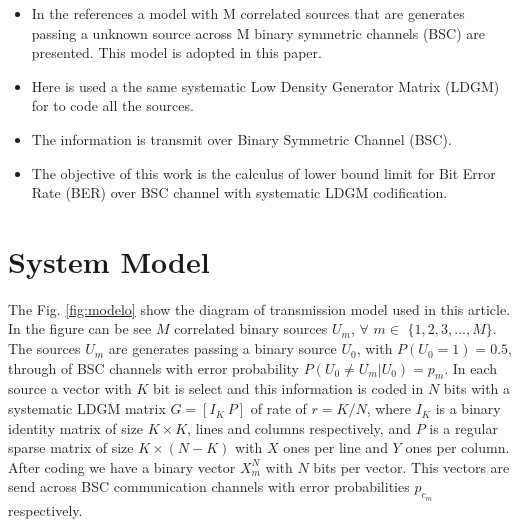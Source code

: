 \documentclass[journal]{IEEEtran}
\begin{document}
\begin{itemize}


 \item In the references \cite{ceobinary1,ceobinary2} a model with M
 correlated sources that are generates passing a unknown source across M binary 
 symmetric channels (BSC) are presented. This model is adopted  in this paper.
 
 
 \item Here is used a the same systematic Low Density Generator Matrix (LDGM) for 
 to code all the sources.
 
 \item The information is transmit over Binary Symmetric Channel (BSC).
 
 \item The objective of this work is the calculus of lower bound limit for Bit Error Rate (BER) 
 over BSC channel with systematic LDGM codification. 
 
\end{itemize}



\section{System Model} 
\label{sec:SystemModel}



The Fig. \ref{fig:modelo} show the diagram of transmission model used in this 
article. In the figure can be see $M$ correlated binary sources $U_m$, $\forall $
$m \in$ $\{1, 2, 3, ..., M\}$. The sources $U_m$ are generates  passing a binary 
source $U_0$, with $P(U_0=1)=0.5$, through of BSC channels with error probability
$P(U_0 \neq U_m | U_0)=p_m$. In each source a vector with $K$ bit is select and 
this information is coded in $N$ bits with a systematic LDGM matrix $G=[I_{K}~ P]$ 
of rate of $r=K/N$, where $I_{K}$ is a binary identity matrix of size $K \times K$, 
lines and columns respectively, and $P$ is a regular sparse matrix of size 
$K \times (N-K) $ with $X$ ones per line and $Y$ ones per column. After coding 
we have a binary vector $X_{m}^{N}$ with $N$ bits per vector. This vectors are 
send across BSC communication channels with error probabilities $p_{c_m}$ 
respectively. 
\end{document}
